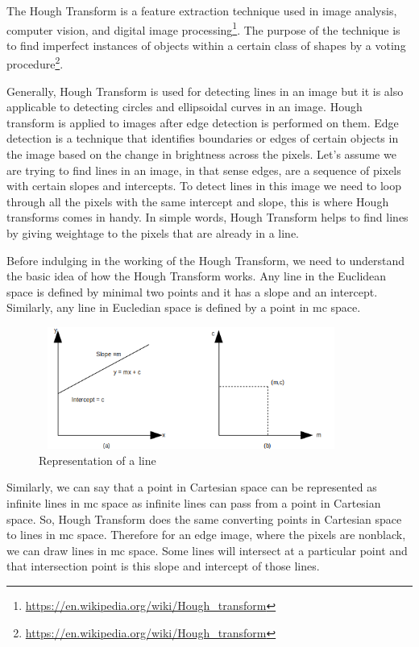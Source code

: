     The Hough Transform is a feature extraction technique used in image analysis, computer vision, and digital image processing\footnote{\url{https://en.wikipedia.org/wiki/Hough_transform}}. The purpose of the technique is to find imperfect instances of objects within a certain class of shapes by a voting procedure\footnote{\url{https://en.wikipedia.org/wiki/Hough_transform}}. 
    
    Generally, Hough Transform is used for detecting lines in an image but it is also applicable to detecting circles and ellipsoidal curves in an image. Hough transform is applied to images after edge detection is performed on them. Edge detection is a technique that identifies boundaries or edges of certain objects in the image based on the change in brightness across the pixels. Let's assume we are trying to find lines in an image, in that sense edges, are a sequence of pixels with certain slopes and intercepts. To detect lines in this image we need to loop through all the pixels with the same intercept and slope, this is where Hough transforms comes in handy. In simple words, Hough Transform helps to find lines by giving weightage to the pixels that are already in a line. 
    
    Before indulging in the working of the Hough Transform, we need to understand the basic idea of how the Hough Transform works. Any line in the Euclidean space is defined by minimal two points and it has a slope and an intercept. Similarly, any line in Eucledian space is defined by a point in mc space.
    
                \begin{figure}[h]
    \centering
    \includegraphics[width=10cm, height =4cm]{images/hough1.png}
    \caption{Representation of a line}
    \end{figure}
    
    Similarly, we can say that a point in Cartesian space can be represented as infinite lines in mc space as infinite lines can pass from a point in Cartesian space. So, Hough Transform does the same converting points in Cartesian space to lines in mc space. Therefore for an edge image, where the pixels are nonblack, we can draw lines in mc space. Some lines will intersect at a particular point and that intersection point is this slope and intercept of those lines. 
    

